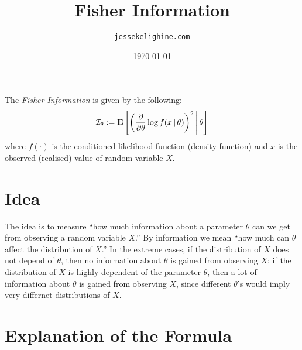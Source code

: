 \documentclass[a4paper,11pt]{article}
\title{Fisher Information}
\author{\texttt{jessekelighine.com}}
\date{\today}
\DeclareMathOperator{\E}{\text{\textrm{\upshape\textbf{E}}}}
\newcommand{\given}[1][]{\,#1|\,}
\begin{document}
\maketitle

\noindent
The \emph{Fisher Information} is given by the following:
\begin{align}\label{eq:fisher}
	\mathcal{I}_\theta
	:= \E\left[\left(\frac{\partial}{\partial\theta}\log f(x\given\theta)\right)^2
	\given[\middle]\theta\right]
\end{align}
where $f(\cdot)$ is the conditioned likelihood function (density function)
and $x$ is the observed (realised) value of random variable $X$.

\section{Idea}

The idea is to measure ``how much information about a parameter $\theta$ can
we get from observing a random variable $X$.''
By information we mean ``how much can $\theta$ affect the distribution of $X$.''
In the extreme cases, if the distribution of $X$ does not depend of $\theta$,
then no information about $\theta$ is gained from observing $X$;
if the distribution of $X$ is highly dependent of the parameter	$\theta$,
then a lot of information about $\theta$ is gained from observing $X$,
since different $\theta$'s would imply very differnet distributions of $X$.

\section{Explanation of the Formula}
\end{document}
